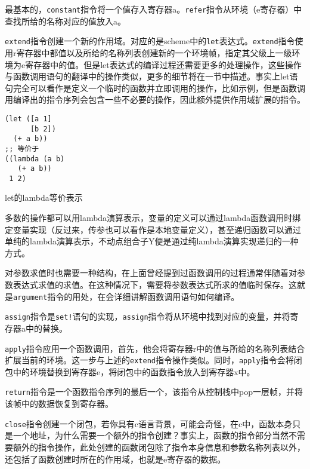 
最基本的，\texttt{constant}指令将一个值存入寄存器a。\texttt{refer}指令从环境（e寄存器）中查找所给的名称对应的值放入a。

\texttt{extend}指令创建一个新的作用域。对应的是scheme中的\texttt{let}表达式。\texttt{extend}指令使用r寄存器中都值以及所给的名称列表创建新的一个环境帧，指定其父级上一级环境为e寄存器中的值。但是let表达式的编译过程还需要更多的处理操作，这些操作与函数调用语句的翻译中的操作类似，更多的细节将在一节中描述。事实上let语句完全可以看作是定义一个临时的函数并立即调用的操作，比如示例，但是函数调用编译出的指令序列会包含一些不必要的操作，因此额外提供作用域扩展的指令。

\begin{code}
\begin{verbatim}
(let ([a 1]
      [b 2])
  (+ a b))
;; 等价于
((lambda (a b)
   (+ a b))
 1 2)
\end{verbatim}
\caption{let的lambda等价表示}
\label{lst:let-lambda-sample}
\end{code}

多数的操作都可以用lambda演算表示，变量的定义可以通过lambda函数调用时绑定变量实现（反过来，传参也可以看作是本地变量定义），甚至递归函数可以通过单纯的lambda演算表示，不动点组合子Y便是通过纯lambda演算实现递归的一种方式。

对参数求值时也需要一种结构，在上面曾经提到过函数调用的过程通常伴随着对参数表达式求值的求值。在这种情况下，需要将参数表达式所求的值临时保存。这就是\texttt{argument}指令的用处，在会详细讲解函数调用语句如何编译。

\texttt{assign}指令是\texttt{set!}语句的实现，\texttt{assign}指令将从环境中找到对应的变量，并将寄存器a中的替换。

\texttt{apply}指令应用一个函数调用，首先，他会将寄存器r中的值与所给的名称列表结合扩展当前的环境。这一步与上述的\texttt{extend}指令操作类似。同时，\texttt{apply}指令会将闭包中的环境替换到寄存器e，将闭包中的函数指令放入到寄存器x中。

\texttt{return}指令是一个函数指令序列的最后一个，该指令从控制栈中pop一层帧，并将该帧中的数据恢复到寄存器。

\texttt{close}指令创建一个闭包，若你具有c语言背景，可能会奇怪，在c中，函数本身只是一个地址，为什么需要一个额外的指令创建？事实上，函数的指令部分当然不需要额外的指令操作，此处创建的函数闭包除了指令本身信息和参数名称列表以外，还包括了函数创建时所在的作用域，也就是e寄存器的数据。

